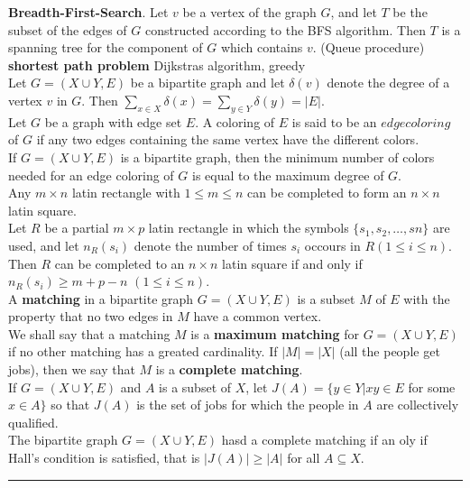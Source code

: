 \documentclass[10pt,landscape]{article}
\begin{document}
\begin{multicols}{3}
\textbf{Breadth-First-Search}. Let $v$ be a vertex of the graph $G$,
and let $T$ be  the subset of the edges of $G$ constructed according
to the BFS algorithm. Then $T$ is a spanning tree for the component of
$G$ which contains $v$. (Queue procedure)\\
\textbf{shortest path problem} Dijkstras algorithm, greedy\\
Let $G = (X \cup Y, E)$ be a bipartite graph and let $\delta(v)$
denote the degree of a vertex $v$ in $G$. Then $\displaystyle\sum_{x
  \in X} \delta(x) = \displaystyle\sum_{y \in Y} \delta(y) = |E|$.\\
Let $G$ be a graph with edge set $E$. A coloring of $E$ is said to be
an $edge coloring$ of $G$ if any two edges containing the same vertex
have the different colors.\\
If $G = (X \cup Y, E)$ is a bipartite graph, then the minimum number
of colors needed for an edge coloring of $G$ is equal to the maximum
degree of $G$.\\
Any $m \times n$ latin rectangle with $1 \leq m \leq n$ can be
completed to form an $n \times n$ latin square.\\
Let $R$ be a partial $m \times p$ latin rectangle in which the symbols
$\{s_{1}, s_{2}, \dots,s{n}\}$ are used, and let $n_{R}(s_{i})$ denote
the number of times $s_{i}$ occours in $R(1 \leq i \leq n)$. Then $R$
can be completed to an $n \times n$ latin square if and only if
$n_{R}(s_{i}) \geq m + p - n$ $(1 \leq i \leq n)$.\\
A \textbf{matching} in a bipartite graph $G = (X \cup Y, E)$ is a
subset $M$ of $E$ with the property that no two edges in $M$ have a
common vertex.\\
We shall say that a matching $M$ is a \textbf{maximum matching} for $G
=(X \cup Y,E)$ if no other matching has a greated cardinality. If $|M|
= |X|$ (all the people get jobs), then we say that $M$ is a
\textbf{complete matching}.\\
If $G = (X \cup Y, E)$ and $A$ is a subset of $X$, let $J(A) = \{y \in
Y | xy \in E$ for some $x \in A\}$ so that $J(A)$ is the set of jobs
for which the people in $A$ are collectively qualified.\\
The bipartite graph $G = (X \cup Y, E)$ hasd a complete matching if an
oly if Hall's condition is satisfied, that is $|J(A)| \geq |A|$ for
all $A \subseteq X$.\\ 




\rule{0.3\linewidth}{0.25pt}
\scriptsize


\end{multicols}
\end{document}
